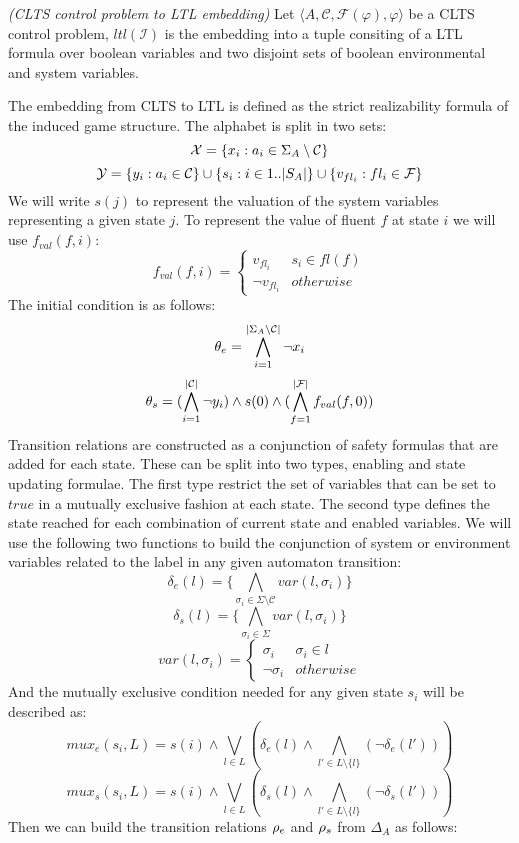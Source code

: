 \begin{definition}
	\label{def:clts_to_ltl_translation} \emph{(CLTS control problem to LTL embedding)} 
	Let $\langle A, \mathcal{C}, \mathcal{F}(\varphi), \varphi \rangle$ be a CLTS control problem, $ltl(\mathcal{I})$ is the embedding into a tuple consiting of a LTL formula over boolean variables and two disjoint sets of boolean environmental and system variables.
\end{definition}


The embedding from CLTS to LTL is defined as the strict realizability formula of the induced game structure. The alphabet is split in two sets:
\[{\mathcal{X}} = \{x_i : a_i \in \Sigma_A \setminus \mathcal{C} \}\]
\[{\mathcal{Y}} = \{y_i : a_i \in \mathcal{C} \} \cup \{s_i : i \in 1..|S_A| \} \cup \{v_{fl_i} : fl_i \in \mathcal{F}\}\]
We will write $s(j)$ to represent the valuation of the system variables representing a given state $j$.
To represent the value of fluent $f$ at state $i$ we will use $f_{val}(f,i)$:
\[
f_{val}(f,i) = \begin{cases}
v_{fl_i} & s_i \in fl(f) \\
\neg v_{fl_i} & otherwise
\end{cases}
\]
The initial condition is as follows:
\[{\theta_e} = \bigwedge_{i = 1}^{|\Sigma_A \setminus \mathcal{C}|}\neg x_i\]
\[{\theta_s} = (\bigwedge_{i = 1}^{|\mathcal{C}|}\neg y_i) \wedge s(0) \wedge (\bigwedge_{f = 1}^{|\mathcal{F}|}f_{val}(f,0))\]
Transition relations are constructed as a conjunction of safety formulas that are added for each state. These can be split into two types, enabling and state updating formulae. The first type restrict the set of variables that can be set to $true$ in a mutually exclusive fashion at each state. The second type defines the state reached for each combination of current state and enabled variables. 
We will use the following two functions to build the conjunction of system or environment variables related to the label in any given automaton transition:
\[\delta_e(l) = \{\bigwedge_{\sigma_i \in \Sigma \setminus \mathcal{C}}var(l, \sigma_i)\}\]
\[\delta_s(l) = \{\bigwedge_{\sigma_i \in \Sigma}var(l, \sigma_i)\}\]
\[
var(l, \sigma_i) = \begin{cases}
\sigma_i & \sigma_i \in l \\
\neg \sigma_i & otherwise
\end{cases}
\]
And the mutually exclusive condition needed for any given state $s_i$ will be described as:
\[mux_e(s_i,L) = s(i) \wedge \bigvee_{l \in L}(\delta_e(l) \wedge \bigwedge_{l' \in L \setminus \{l\}}(\neg \delta_e(l')) ) \]
\[mux_s(s_i,L) = s(i) \wedge \bigvee_{l \in L}(\delta_s(l) \wedge \bigwedge_{l' \in L \setminus \{l\}}(\neg \delta_s(l')) ) \]
Then we can build the transition relations ${\rho_e}$ and ${\rho_s}$ from $\Delta_A$ as follows:

